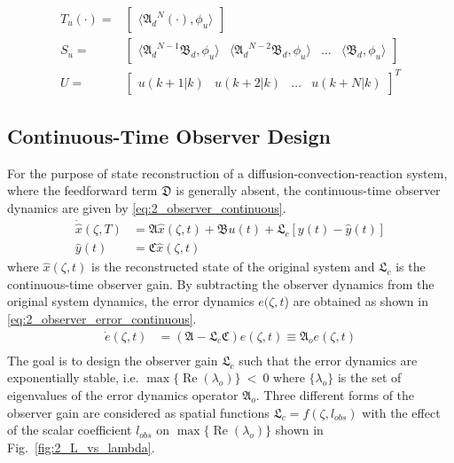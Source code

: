 \begin{equation}
\begin{aligned}
        T_u (\cdot) = &\begin{bmatrix}
            \langle {\mathfrak{A}_d}^{N} (\cdot), {\phi_u} \rangle
        \end{bmatrix} \\
        S_u = &\begin{bmatrix}
            \langle {\mathfrak{A}_d}^{N-1} \mathfrak{B}_d, {\phi_u} \rangle & 
            \langle {\mathfrak{A}_d}^{N-2} \mathfrak{B}_d, {\phi_u} \rangle &
            \hdots &
            \langle \mathfrak{B}_d, {\phi_u} \rangle
        \end{bmatrix} \\
        U = &\begin{bmatrix}
            u(k+1|k) & u(k+2|k) & \hdots & u(k+N|k)
        \end{bmatrix}^T
    \end{aligned}
\end{equation}


\subsection{Continuous-Time Observer Design}
For the purpose of state reconstruction of a diffusion-convection-reaction system, where the feedforward term $\mathfrak{D}$ is generally absent, the continuous-time observer dynamics are given by \eqref{eq:2_observer_continuous}.
\begin{equation} \label{eq:2_observer_continuous}
    \begin{aligned}
        \dot{{\hat{x}}}(\zeta, T) &= \mathfrak{A} {\hat{x}}(\zeta, t) + \mathfrak{B} u(t) + \mathfrak{L}_c [y(t) - \hat{y}(t)] \\
        \hat{y}(t) &= \mathfrak{C} {\hat{x}}(\zeta, t)
    \end{aligned}
\end{equation}
where ${\hat{x}}(\zeta, t)$ is the reconstructed state of the original system and $\mathfrak{L}_c$ is the continuous-time observer gain. By subtracting the observer dynamics from the original system dynamics, the error dynamics $e(\zeta,t$) are obtained as shown in \eqref{eq:2_observer_error_continuous}.
\begin{equation} \label{eq:2_observer_error_continuous}
    \begin{aligned}
        \dot{e}(\zeta, t) &= (\mathfrak{A} - \mathfrak{L}_c \mathfrak{C}) e(\zeta, t) \equiv \mathfrak{A}_o e(\zeta,t) \\
    \end{aligned}
\end{equation}
The goal is to design the observer gain $\mathfrak{L}_c$ such that the error dynamics are exponentially stable, i.e. $\max\{\operatorname{Re}(\lambda_{o})\}~<~0$ where $\{\lambda_{o}\}$ is the set of eigenvalues of the error dynamics operator $\mathfrak{A}_o$. Three different forms of the observer gain are considered as spatial functions $\mathfrak{L}_c = f(\zeta, l_{obs})$ with the effect of the scalar coefficient $l_{obs}$ on $\max\{\operatorname{Re}(\lambda_{o})\}$ shown in Fig.~\ref{fig:2_L_vs_lambda}.

